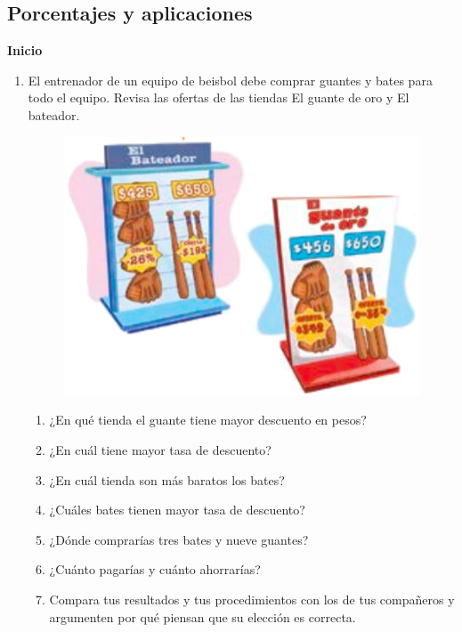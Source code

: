\documentclass[11pt]{book}
\begin{document}
\subsection{Porcentajes y aplicaciones}
\begin{boxK}
  \begin{center}\textbf{Inicio}\end{center}

  \begin{enumerate}
    \item El entrenador de un equipo de beisbol debe comprar guantes y bates para todo el equipo.
          Revisa las ofertas de las tiendas El guante de oro y El bateador.
          \begin{figure}[H]
            \centering
            \includegraphics[width=.5\linewidth]{tiendas.png}
            \label{fig:tiendas}
          \end{figure}
          \begin{enumerate}
            \item ¿En qué tienda el guante tiene mayor descuento en pesos?
            \item ¿En cuál tiene mayor tasa de descuento?
            \item ¿En cuál tienda son más baratos los bates?
            \item ¿Cuáles bates tienen mayor tasa de descuento?
            \item ¿Dónde comprarías tres bates y nueve guantes?
            \item ¿Cuánto pagarías y cuánto ahorrarías?
            \item Compara tus resultados y tus procedimientos con los de tus
                  compañeros y argumenten por qué piensan que su elección
                  es correcta.
          \end{enumerate}
  \end{enumerate}
\end{boxK}
\end{document}
